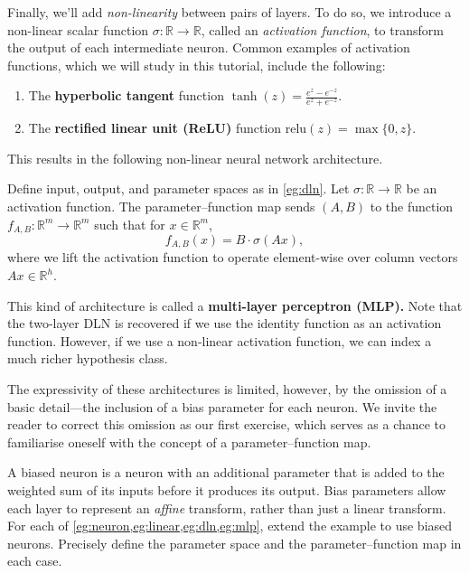 \documentclass[11pt]{article}
\newcommand{\R}{\mathbb{R}}
\newcommand{\relu}{\mathrm{relu}}
\begin{document}
Finally, we'll add \emph{non-linearity} between pairs of layers. To do so, we
introduce a non-linear scalar function $\sigma : \R \to \R$, called an
\emph{activation function}, to transform the output of each intermediate
neuron. Common examples of activation functions, which we will study in this
tutorial, include the following:
\begin{enumerate}
    \item
        The \textbf{hyperbolic tangent} function
            $\displaystyle \tanh(z) = \frac{e^z-e^{-z}}{e^z + e^{-z}}$.
    \item
        The \textbf{rectified linear unit (ReLU)} function $\relu(z) = \max\{0, z\}$.
\end{enumerate}
This results in the following non-linear neural network architecture.

\begin{example}\label{eg:mlp}
    Define input, output, and parameter spaces as in \cref{eg:dln}.
    Let $\sigma : \R \to \R$ be an activation function.
    The parameter--function map sends $(A, B)$ to the function
        $f_{A,B} : \R^m \to \R^m$ such that for $x \in \R^m$,
    \begin{equation}
        f_{A,B}(x)
        = B \cdot \sigma( A x ),
    \end{equation}
    where we lift the activation function to operate element-wise over column
    vectors $A x \in \R^h$.
\end{example}
This kind of architecture is called a \textbf{multi-layer perceptron (MLP).}
Note that the two-layer DLN is recovered if we use the identity function as an
activation function. However, if we use a non-linear activation function, we
can index a much richer hypothesis class.

The expressivity of these architectures is limited, however, by the omission of
a basic detail---the inclusion of a bias parameter for each neuron. We invite
the reader to correct this omission as our first exercise, which serves as a
chance to familiarise oneself with the concept of a parameter--function map.

\begin{exercise}
\label{ex:biased-neurons}
    A biased neuron is a neuron with an additional parameter that is added to
    the weighted sum of its inputs before it produces its output. Bias
    parameters allow each layer to represent an \emph{affine} transform, rather
    than just a linear transform. For each of
    \cref{eg:neuron,eg:linear,eg:dln,eg:mlp}, extend the example to use
    biased neurons. Precisely define the parameter space and the
    parameter--function map in each case.
\end{exercise}
\end{document}
